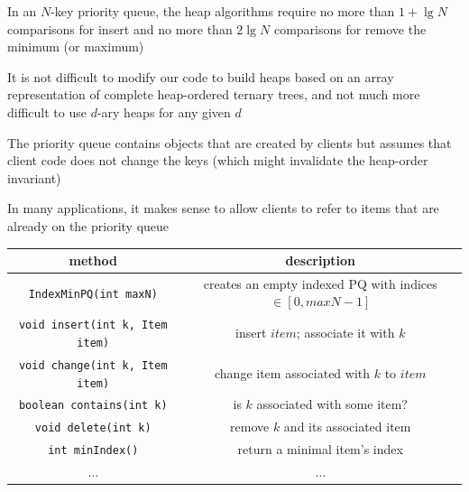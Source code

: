 \documentclass[8pt,a4paper,compress]{beamer}
\begin{document}
\begin{frame}[fragile]
In an $N$-key priority queue, the heap algorithms require no more than $1 + \lg N$ comparisons for insert and no more than $2 \lg N$ comparisons for remove the minimum (or maximum)

\bigskip

It is not difficult to modify our code to build heaps based on an array representation of complete heap-ordered ternary trees, and not much more difficult to use $d$-ary heaps for any given $d$

\bigskip

The priority queue contains objects that are created by clients but assumes that client code does not change the keys (which might invalidate the heap-order invariant)

\bigskip

In many applications, it makes sense to allow clients to refer to items that are already on the priority queue 
\begin{center}
\begin{tabular}{cc}
method & description \\ \hline
\lstinline$IndexMinPQ(int maxN)$ & \makecell{creates an empty indexed PQ with \\ indices $\in [0, maxN - 1]$} \\
\lstinline$void insert(int k, Item item)$ & insert $item$; associate it with $k$ \\
\lstinline$void change(int k, Item item)$ & change item associated with $k$ to $item$ \\
\lstinline$boolean contains(int k)$ & is $k$ associated with some item? \\
\lstinline$void delete(int k)$ & remove $k$ and its associated item \\
\lstinline$int minIndex()$ & return a minimal item's index \\
$\dots$ & $\dots$
\end{tabular} 
\end{center}
\end{frame}
\end{document}
